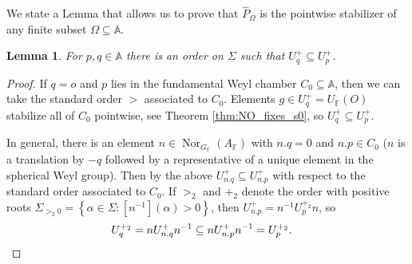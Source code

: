 \documentclass[12pt]{amsart}
\newcommand{\F}{\mathbb{F} }
\newcommand{\A}{\mathbb{A}}
\numberwithin{equation}{section}
\newtheorem{lemma}[theorem]{Lemma}
\theoremstyle{remark} %
\begin{document}
		
		We state a Lemma that allows us to prove that $\hat{P}_\Omega$ is the pointwise stabilizer of any finite subset $\Omega\subseteq \A$. 
		\begin{lemma}\label{lem:BTstab_dir_lemma}
			For $p,q\in \A$ there is an order on $\Sigma$ such that $U_q^+ \subseteq U_p^+$.
		\end{lemma}
		\begin{proof}
			If $q=o$ and $p$ lies in the fundamental Weyl chamber $C_0 \subseteq \A$, then we can take the standard order $>$ associated to $C_0$. Elements $g\in U_q^+ = U_\F(O)$ stabilize all of $C_0$ pointwise, see Theorem \ref{thm:NO_fixes_s0}, so $U_q^+ \subseteq U_p^+$.
			
			In general, there is an element $n \in \operatorname{Nor}_{G_\F}(A_\F)$ with $n.q = 0$ and $n.p \in C_0$ ($n$ is a translation by $-q$ followed by a representative of a unique element in the spherical Weyl group). Then by the above $U_{n.q}^+ \subseteq U_{n.p}^+$ with respect to the standard order associated to $C_0$. If $>_2$ and $+_2$ denote the order with positive roots $\Sigma_{>_2 0} = \left\{ \alpha \in \Sigma \colon [n^{-1}](\alpha) > 0 \right\} $, then $U_{n.p}^+ =n^{-1} U_{p}^{+_2} n$, so
			\begin{align*}
	U_q^{+_2} &= n U_{n.q}^+ n^{-1} \subseteq n U_{n.p}^+ n^{-1}= U_p^{+_2}. \qedhere
			\end{align*}
			
		\end{proof}
		
\end{document}
